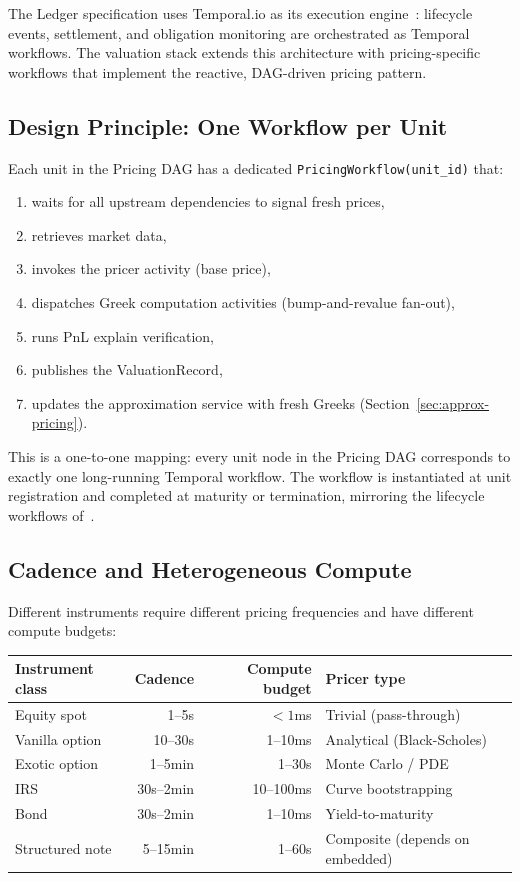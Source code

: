 \documentclass[11pt,a4paper]{article}
\begin{document}
The Ledger specification uses Temporal.io as its execution engine~\cite[\S14]{ledger}: lifecycle events, settlement, and obligation monitoring are orchestrated as Temporal workflows.  The valuation stack extends this architecture with pricing-specific workflows that implement the reactive, DAG-driven pricing pattern.

\subsection{Design Principle: One Workflow per Unit}

Each unit in the Pricing DAG has a dedicated \texttt{PricingWorkflow(unit\_id)} that:
\begin{enumerate}[nosep]
\item waits for all upstream dependencies to signal fresh prices,
\item retrieves market data,
\item invokes the pricer activity (base price),
\item dispatches Greek computation activities (bump-and-revalue fan-out),
\item runs PnL explain verification,
\item publishes the ValuationRecord,
\item updates the approximation service with fresh Greeks (Section~\ref{sec:approx-pricing}).
\end{enumerate}

This is a one-to-one mapping: every unit node in the Pricing DAG corresponds to exactly one long-running Temporal workflow.  The workflow is instantiated at unit registration and completed at maturity or termination, mirroring the lifecycle workflows of~\cite[\S14.4]{ledger}.

\subsection{Cadence and Heterogeneous Compute}

Different instruments require different pricing frequencies and have different compute budgets:

\begin{center}
\small
\begin{tabular}{l r r l}
\toprule
\textbf{Instrument class} & \textbf{Cadence} & \textbf{Compute budget} & \textbf{Pricer type} \\
\midrule
Equity spot & 1--5s & $< 1$ms & Trivial (pass-through) \\
Vanilla option & 10--30s & 1--10ms & Analytical (Black-Scholes) \\
Exotic option & 1--5min & 1--30s & Monte Carlo / PDE \\
IRS & 30s--2min & 10--100ms & Curve bootstrapping \\
Bond & 30s--2min & 1--10ms & Yield-to-maturity \\
Structured note & 5--15min & 1--60s & Composite (depends on embedded) \\
\bottomrule
\end{tabular}
\end{center}
\end{document}
